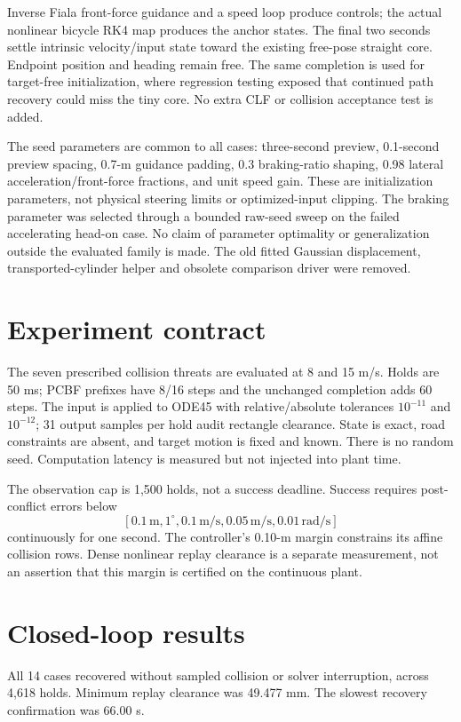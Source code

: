 \documentclass[10pt]{article}
\begin{document}
Inverse Fiala front-force guidance and a speed loop produce controls; the actual
nonlinear bicycle RK4 map produces the anchor states. The final two seconds
settle intrinsic velocity/input state toward the existing free-pose straight
core. Endpoint position and heading remain free. The same completion is used
for target-free initialization, where regression testing exposed that continued
path recovery could miss the tiny core. No extra CLF or collision acceptance
test is added.

The seed parameters are common to all cases: three-second preview, 0.1-second
preview spacing, 0.7-m guidance padding, 0.3 braking-ratio shaping, 0.98 lateral
acceleration/front-force fractions, and unit speed gain. These are initialization
parameters, not physical steering limits or optimized-input clipping. The
braking parameter was selected through a bounded raw-seed sweep on the failed
accelerating head-on case. No claim of parameter optimality or generalization
outside the evaluated family is made. The old fitted Gaussian displacement,
transported-cylinder helper and obsolete comparison driver were removed.

\section{Experiment contract}
The seven prescribed collision threats are evaluated at 8 and 15 m/s. Holds are
50 ms; PCBF prefixes have 8/16 steps and the unchanged completion adds 60 steps.
The input is applied to ODE45 with relative/absolute tolerances $10^{-11}$ and
$10^{-12}$; 31 output samples per hold audit rectangle clearance. State is exact,
road constraints are absent, and target motion is fixed and known. There is no
random seed. Computation latency is measured but not injected into plant time.

The observation cap is 1,500 holds, not a success deadline. Success requires
post-conflict errors below
\[ [0.1\,\mathrm m,1^\circ,0.1\,\mathrm{m/s},
0.05\,\mathrm{m/s},0.01\,\mathrm{rad/s}] \]
continuously for one second.
The controller's 0.10-m margin constrains its affine collision rows. Dense
nonlinear replay clearance is a separate measurement, not an assertion that
this margin is certified on the continuous plant.

\section{Closed-loop results}
All 14 cases recovered without sampled collision or solver interruption, across 4,618 holds. Minimum replay clearance was 49.477 mm. The slowest recovery confirmation was 66.00 s.
\end{document}
